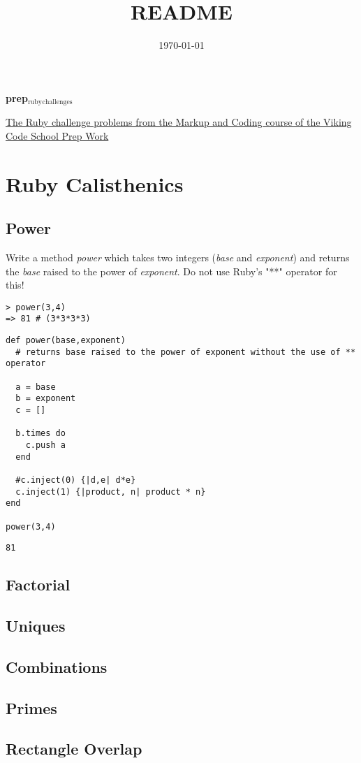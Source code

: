 \documentclass[11pt]{article}
\date{\today}
\title{README}
\begin{document}
\maketitle
\textbf{prep$_{\text{ruby}}$$_{\text{challenges}}$}

\href{http://www.vikingcodeschool.com/web-markup-and-coding/level-up-your-ruby-judo}{The Ruby challenge problems from the Markup and Coding course of the Viking Code School Prep Work}

\section{Ruby Calisthenics}
\label{sec-1}

\subsection{Power}
\label{sec-1-1}

Write a method \emph{power} which takes two integers (\emph{base} and \emph{exponent}) and 
returns the \emph{base} raised to the power of \emph{exponent}. Do not use Ruby's "**"
operator for this!

\begin{verbatim}
> power(3,4)
=> 81 # (3*3*3*3)
\end{verbatim}

\begin{verbatim}
def power(base,exponent)
  # returns base raised to the power of exponent without the use of ** operator

  a = base
  b = exponent
  c = []

  b.times do
    c.push a
  end

  #c.inject(0) {|d,e| d*e}
  c.inject(1) {|product, n| product * n}
end

power(3,4)
\end{verbatim}

\begin{verbatim}
81
\end{verbatim}

\subsection{Factorial}
\label{sec-1-2}
\subsection{Uniques}
\label{sec-1-3}
\subsection{Combinations}
\label{sec-1-4}
\subsection{Primes}
\label{sec-1-5}
\subsection{Rectangle Overlap}
\label{sec-1-6}
\end{document}
